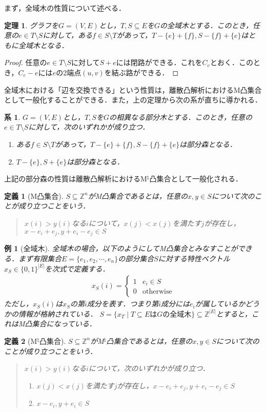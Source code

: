 \documentclass[uplatex]{jsarticle}
\newcommand{\abs}[1]{ \left| #1 \right| }
\newcommand{\Int}{\mathbb{Z}}
\theoremstyle{break}
\newtheorem{theo}{定理}[section]
\newtheorem{defi}{定義}[section]
\newtheorem{proof}{証明}[section]
\newtheorem{example}{例}[section]
\newtheorem{cor}{系}[section]
\begin{document}
まず，全域木の性質について述べる．
\begin{theo}
  グラフを$G=(V,E)$とし，$T,S\subseteq E$を$G$の全域木とする．このとき，任意の$e\in T\setminus S$に対して，ある$f\in S\setminus T$があって，$T-\{e\}+\{f\},S-\{f\}+\{e\}$はともに全域木となる．
\end{theo}
\begin{proof}
  任意の$e\in T\setminus S$に対して$S+e$には閉路ができる．これを$C_e$とおく．このとき，$C_e-e$には$e$の2端点$(u,v)$を結ぶ路ができる．
\end{proof}
全域木における「辺を交換できる」という性質は，離散凸解析におけるM凸集合として一般化することができる．また，上の定理から次の系が直ちに導かれる．
\begin{cor}
  $G=(V,E)$とし，$T,S$を$G$の相異なる部分木とする．このとき，任意の$e\in T\setminus S$に対して，次のいずれかが成り立つ．
  \begin{enumerate}
    \item ある$f\in S\setminus T$があって，$T-\{e\}+\{f\},S-\{f\}+\{e\}$は部分森となる．
    \item $T-\{e\},S+\{e\}$は部分森となる．
  \end{enumerate}
\end{cor}
上記の部分森の性質は離散凸解析におけるM${}^\natural$凸集合として一般化される．
\begin{defi}[M凸集合] 
  $S\subseteq \Int^n$がM凸集合であるとは，任意の$x,y\in S$について次のことが成り立つことをいう．
  \begin{quote}
    $x(i) > y(i)$なる$i$について，$x(j) < x(j)$を満たす$j$が存在し，$x-e_i+e_j,y+e_i-e_j\in S$
  \end{quote}
\end{defi}
\begin{example}[全域木] 
全域木の場合，以下のようにしてM凸集合とみなすことができる．まず有限集合$E = \{e_1,e_2,\cdots,e_n\}$の部分集合$S$に対する特性ベクトル$x_S\in \{0,1\}^{\abs{E}}$を次式で定義する．
\begin{align*}
  x_S(i) = \begin{cases}
    1 & e_i \in S \\
    0 & \mathrm{otherwise}
  \end{cases}
\end{align*}
ただし，$x_S(i)$は$x_S$の第$i$成分を表す．つまり第$i$成分には$e_i$が属しているかどうかの情報が格納されている．
$S = \{ x_T \mid T \subseteq E はGの全域木\} \subseteq \Int^{\abs{E}}$とすると，これはM凸集合になっている．
\end{example}
\begin{defi}[M${}^\natural$凸集合] 
  $S\subseteq \Int^n$がM${}^\natural$凸集合であるとは，任意の$x,y\in S$について次のことが成り立つことをいう．
  \begin{quote}
    $x(i) > y(i)$なる$i$について，次のいずれかが成り立つ．
    \begin{enumerate}
      \item $x(j) < x(j)$を満たす$j$が存在し，$x-e_i+e_j,y+e_i-e_j\in S$ 
      \item $x-e_i,y+e_i\in S$
    \end{enumerate}   
  \end{quote}
\end{defi}
\end{document}

